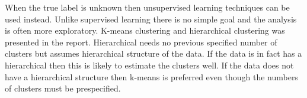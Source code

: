When the true label is unknown then unsupervised learning techniques can be used instead. Unlike supervised learning there is no simple goal and the analysis is often more exploratory. K-means clustering and hierarchical clustering was presented in the report. Hierarchical needs no previous specified number of clusters but assumes hierarchical structure of the data. If the data is in fact has a hierarchical then this is likely to estimate the clusters well. If the data does not have a hierarchical structure then k-means is preferred even though the numbers of clusters must be prespecified. 



